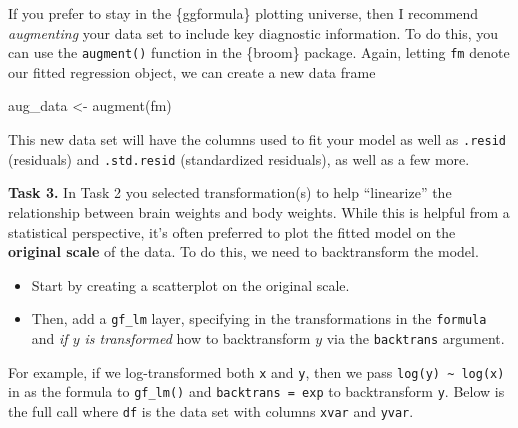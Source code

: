 \documentclass[
  letterpaper,
  DIV=11,
  numbers=noendperiod]{scrartcl}
\newenvironment{Shaded}{\begin{snugshade}}{\end{snugshade}}
\newcommand{\FunctionTok}[1]{\textcolor[rgb]{0.28,0.35,0.67}{#1}}
\newcommand{\NormalTok}[1]{\textcolor[rgb]{0.00,0.23,0.31}{#1}}
\newcommand{\OtherTok}[1]{\textcolor[rgb]{0.00,0.23,0.31}{#1}}
\providecommand{\tightlist}{%
  \setlength{\itemsep}{0pt}\setlength{\parskip}{0pt}}\usepackage{longtable,booktabs,array}
\begin{document}
\begin{tcolorbox}[enhanced jigsaw, coltitle=black, bottomtitle=1mm, colframe=quarto-callout-color-frame, left=2mm, title={An alternative approach to residual plots in R}, colbacktitle=quarto-callout-color!10!white, breakable, rightrule=.15mm, arc=.35mm, opacityback=0, toptitle=1mm, bottomrule=.15mm, leftrule=.75mm, titlerule=0mm, colback=white, opacitybacktitle=0.6, toprule=.15mm]
If you prefer to stay in the \{ggformula\} plotting universe, then I
recommend \emph{augmenting} your data set to include key diagnostic
information. To do this, you can use the \texttt{augment()} function in
the \{broom\} package. Again, letting \texttt{fm} denote our fitted
regression object, we can create a new data frame

\begin{Shaded}
\begin{Highlighting}[]
\NormalTok{aug\_data }\OtherTok{\textless{}{-}} \FunctionTok{augment}\NormalTok{(fm)}
\end{Highlighting}
\end{Shaded}

This new data set will have the columns used to fit your model as well
as \texttt{.resid} (residuals) and \texttt{.std.resid} (standardized
residuals), as well as a few more.
\end{tcolorbox}

\bigskip

\textbf{Task 3.} In Task 2 you selected transformation(s) to help
``linearize'' the relationship between brain weights and body weights.
While this is helpful from a statistical perspective, it's often
preferred to plot the fitted model on the \textbf{original scale} of the
data. To do this, we need to backtransform the model.

\begin{itemize}
\tightlist
\item
  Start by creating a scatterplot on the original scale.
\item
  Then, add a \texttt{gf\_lm} layer, specifying in the transformations
  in the \texttt{formula} and \emph{if \(y\) is transformed} how to
  backtransform \(y\) via the \texttt{backtrans} argument.
\end{itemize}

For example, if we log-transformed both \texttt{x} and \texttt{y}, then
we pass \texttt{log(y)\ \textasciitilde{}\ log(x)} in as the formula to
\texttt{gf\_lm()} and \texttt{backtrans\ =\ exp} to backtransform
\texttt{y}. Below is the full call where \texttt{df} is the data set
with columns \texttt{xvar} and \texttt{yvar}.
\end{document}
